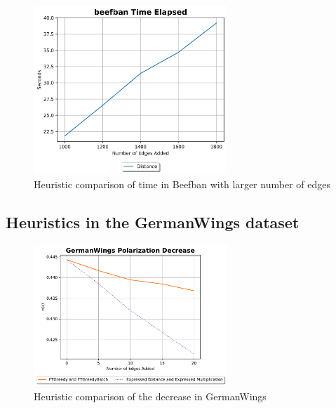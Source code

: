 \begin{figure}[H]
	\centering
	\includegraphics[width=0.65\textwidth]{Figures/beefban Time Elapsed 2}
	\caption{Heuristic comparison of time in Beefban with larger number of edges}
	\label{fig:beefban2_time}
\end{figure}

\clearpage



\subsection{Heuristics in the GermanWings dataset}

\begin{figure}[H]
	\centering
	\includegraphics[width=0.65\textwidth]{Figures/GermanWings Polarization Decrease}
	\caption{Heuristic comparison of the decrease in GermanWings}
	\label{fig:germanwings_pol}
\end{figure}


